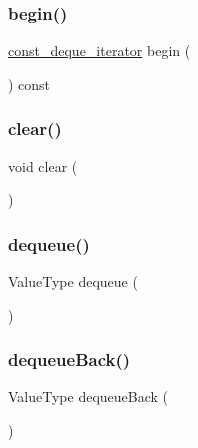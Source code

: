 \mbox{\label{classDeque_a92be94822f29cf2d75f992e50763f34d}} 
\subsubsection{\texorpdfstring{begin()}{begin()}\hspace{0.1cm}{\footnotesize\ttfamily [2/2]}}
{\footnotesize\ttfamily \mbox{\hyperlink{classDeque_1_1const__deque__iterator}{const\+\_\+deque\+\_\+iterator}} begin (\begin{DoxyParamCaption}{ }\end{DoxyParamCaption}) const\hspace{0.3cm}{\ttfamily [inline]}}

\mbox{\label{classDeque_ac8bb3912a3ce86b15842e79d0b421204}} 
\subsubsection{\texorpdfstring{clear()}{clear()}}
{\footnotesize\ttfamily void clear (\begin{DoxyParamCaption}{ }\end{DoxyParamCaption})}

\mbox{\label{classDeque_aaee07e371e2370e76e6c42bada727ba2}} 
\subsubsection{\texorpdfstring{dequeue()}{dequeue()}}
{\footnotesize\ttfamily Value\+Type dequeue (\begin{DoxyParamCaption}{ }\end{DoxyParamCaption})}

\mbox{\label{classDeque_a0f7233390ba171bc0897e5f9618ac4a6}} 
\subsubsection{\texorpdfstring{dequeue\+Back()}{dequeueBack()}}
{\footnotesize\ttfamily Value\+Type dequeue\+Back (\begin{DoxyParamCaption}{ }\end{DoxyParamCaption})}

